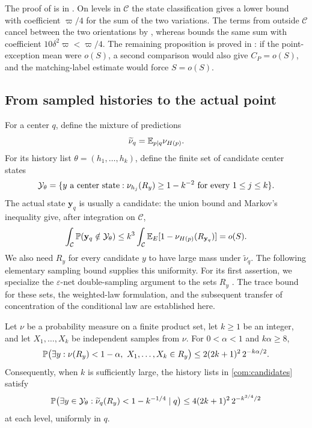 The proof of  is in
. On levels in $\mathcal C$ the state
classification gives a lower bound with coefficient \(\varpi/4\)
for the sum of the two variations. The terms from outside $\mathcal C$ cancel between
the two orientations by , whereas
 bounds the same sum with coefficient
\(10\delta^2\varpi<\varpi/4\). The remaining proposition is
proved in : if the point-exception mean
were \(o(S)\), a second comparison would also give \(C_P=o(S)\),
and the matching-label estimate would force \(S=o(S)\).

\subsection{From sampled histories to the actual point}

For a center \(q\), define the mixture of predictions
\[
 \widetilde\nu_q=\mathbb E_{p\mid q}\nu_{H(p)}.
\]
For its history list \(\theta=(h_1,\ldots,h_k)\), define the finite set of candidate
center states
\begin{equation}\label{com:candidates}
 \mathcal Y_\theta
 =\{y\text{ a center state}:\nu_{h_j}(R_y)\ge1-k^{-2}
                      \text{ for every }1\le j\le k\}.
\end{equation}
The actual state \(\mathbf y_q\) is usually a candidate: the union bound and Markov's
inequality give, after integration on \(\mathcal C\),
\begin{equation}\label{com:actual-candidate}
 \int_{\mathcal C}\mathbb P(\mathbf y_q\notin\mathcal Y_\theta)
 \le k^3\int_{\mathcal C}
       \mathbb E_E[1-\nu_{H(p)}(R_{\mathbf y_q})]=o(S).
\end{equation}
We also need \(R_y\) for every candidate \(y\) to have large mass under
\(\widetilde\nu_q\). The following elementary sampling bound supplies this
uniformity.
For its first assertion, we specialize the \(\varepsilon\)-net
double-sampling argument to the sets \(R_y\)
\cite[Lemmas~3.4--3.5]{HausslerWelzl1987}.
The trace bound for these sets, the weighted-law formulation, and the subsequent
transfer of concentration of the conditional law are established here.

\begin{lemma}\label{com:ghost}
Let \(\nu\) be a probability measure on a finite product set, let
\(k\ge1\) be an integer, and let \(X_1,\ldots,X_k\) be independent
samples from \(\nu\). For
\(0<\alpha<1\) and \(k\alpha\ge8\),
\[
 \mathbb P\bigl(\exists y:\nu(R_y)<1-\alpha,
                    \ X_1,\ldots,X_k\in R_y\bigr)
 \le 2(2k+1)^2\,2^{-k\alpha/2}.
\]
Consequently, when \(k\) is sufficiently large, the history lists in
\eqref{com:candidates} satisfy
\begin{equation}\label{com:mixture}
 \mathbb P\bigl(\exists y\in\mathcal Y_\theta:
              \widetilde\nu_q(R_y)<1-k^{-1/4}\mid q\bigr)
 \le 4(2k+1)^2\,2^{-k^{3/4}/2}
\end{equation}
at each level, uniformly in \(q\).
\end{lemma}

